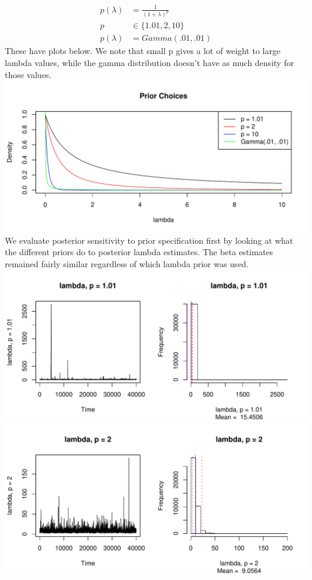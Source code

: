 \documentclass[12pt]{article}
\begin{document}
\begin{enumerate}[(a)]
\begin{enumerate}[(i)]
	 \begin{align*}
	 p(\lambda) &= \frac{1}{(1+\lambda)^{p}}\\
	 p &\in \{1.01, 2, 10\}\\
	 p(\lambda) &= Gamma(.01, .01)
	 \end{align*}
	 These have plots below. We note that small p gives a lot of weight to large lambda values, while the gamma distribution doesn't have as much density for those values. \\
	 \newline
	 \includegraphics[scale = .7]{plot10.pdf}\\
	 \newline
	 We evaluate posterior sensitivity to prior specification first by looking at what the different priors do to posterior lambda estimates. The beta estimates remained fairly similar regardless of which lambda prior was used. \\
	 \newline
	 \includegraphics[scale = .7]{plot11.pdf}\\
	 \includegraphics[scale = .7]{plot12.pdf}\\

\end{enumerate}
\end{enumerate}
\end{document}
